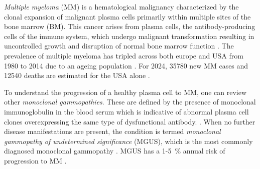 





%
\label{sec:intro_myeloma}%
\emph{Multiple myeloma} (MM) is a hematological malignancy characterized by the
clonal expansion of malignant plasma cells primarily within multiple sites of
the bone marrow (BM). This cancer arises from plasma cells, the
antibody-producing cells of the immune system, which undergo malignant
transformation resulting in uncontrolled growth and disruption of normal bone
marrow function \cite{yangPathogenesisTreatmentMultiple2022}. The prevalence of
multiple myeloma has tripled across both europe and USA from 1980 to 2014 due to
an ageing population \cite{ociasTrendsHematologicalCancer2016,
    turessonRapidlyChangingMyeloma2018}. For 2024, 35780 new MM cases and 12540
deaths are estimated for the USA alone \cite{siegelCancerStatistics20242024}.

To understand the progression of a healthy plasma cell to MM, one can review
other \emph{monoclonal gammopathies}. These are defined by the presence of
monoclonal immunoglobulin in the blood serum which is indicative of abnormal
plasma cell clones overexpressing the same type of dysfunctional antibody.
\cite{kyleMonoclonalGammopathyUndetermined1997,
    fermandMonoclonalGammopathyClinical2018}. When no further disease manifestations
are present, the condition is termed \emph{monoclonal gammopathy of undetermined
    significance} (MGUS), which is the most commonly diagnosed monoclonal gammopathy
\cite{kyleMonoclonalGammopathyUndetermined1997}. MGUS has a 1-\SI{5}{\percent}
annual risk of progression to MM \cite{rajkumarInternationalMyelomaWorking2014}.

